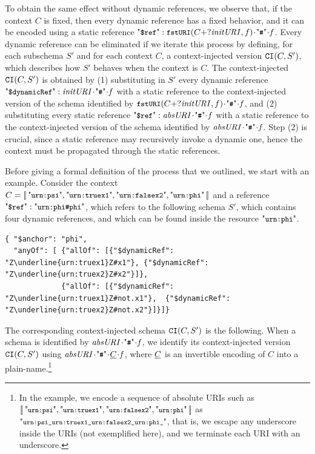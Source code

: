 To obtain the same effect without dynamic references, we observe that, if the context $C$ is fixed, 
then every dynamic reference has a fixed behavior, and it can be encoded
using a static reference $\qdref:  \fstURI(C+?\key{initURI},f)\catHash\key{f}$.
Every dynamic reference can be eliminated if we iterate this process by defining, for each subschema $S'$ and 
for each context $C$, a context-injected version ${\tt CI}(C,S')$, which describes how $S'$ behaves when the
context is $C$.
The context-injected ${\tt CI}(C,S')$ is obtained by (1) substituting in $S'$ every dynamic reference
$\qddref: \key{initURI}\catHash\key{f}$ 
with a static reference to the context-injected version of the schema identified by 
$\fstURI(C+?\key{initURI},f)\catHash\key{f}$, and  (2) substituting every static reference
$\qdref: \key{absURI}\catHash\key{f}$ 
with a static reference to the context-injected version of the schema identified by
$\key{absURI}\catHash\key{f}$. Step (2) is crucial, since a static reference may recursively invoke a
dynamic one, hence the context must be propagated through the static references.

Before giving a formal definition of the process that we outlined, we start with an example.
Consider the context 
 $C=\List{\qkw{urn:psi}, \qkw{urn:truex1}, \qkw{urn:falsex2}, \qkw{urn:phi}}$ and a
reference $\qdref: \qkw{urn:phi\#phi}$, which refers to the following schema $S'$,
which contains four dynamic references, and which can be found inside the resource $\qkw{urn:phi}$.
\begin{querybox}{}
\begin{lstlisting}[style=query,escapechar=Z]
{ "$anchor": "phi", 
  "anyOf": [ {"allOf": [{"$dynamicRef": "Z\underline{urn:truex1}Z#x1"}, {"$dynamicRef": "Z\underline{urn:truex2}Z#x2"}]},
             {"allOf": [{"$dynamicRef": "Z\underline{urn:truex1}Z#not.x1"},  {"$dynamicRef": "Z\underline{urn:truex2}Z#not.x2"}]}]}
\end{lstlisting}
\end{querybox}

The corresponding context-injected schema ${\tt CI}(C,S')$ is the following.
When a schema is identified by $\key{absURI}\catHash\key{f}$, we identify its 
context-injected version ${\tt CI}(C,S')$ using $\key{absURI}\catHash\ECC\cat\key{f}$, 
where $\underline{C}$ is an invertible encoding of 
$C$ into a plain-name.\footnote{In the example, we encode a sequence of absolute URIs such as 
$\List{\qkwfn{urn:psi}, \qkwfn{urn:truex1}, \qkwfn{urn:falsex2}, \qkwfn{urn:phi}}$ as ${\qkwfn{urn:psi\_urn:truex1\_urn:falsex2\_urn:phi\_}}$,
that is, we escape any underscore inside the URIs (not exemplified here), and we terminate each 
URI with an underscore.} 

